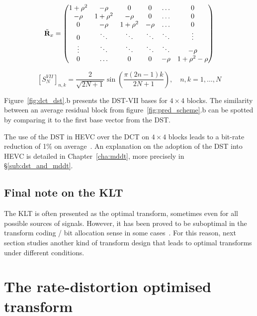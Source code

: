 \documentclass[11pt,a4paper,openright,twoside]{book}
\numberwithin{equation}{section} %
\numberwithin{figure}{section} %
\numberwithin{table}{section} %
\begin{document}
\begin{equation}
	\tilde{\mathbf{R}}_x =
	\begin{pmatrix}
		1+\rho^2 & -\rho    & 0        & 0      & \hdots & 0            \\
		-\rho    & 1+\rho^2 & -\rho    & 0      & \hdots & 0            \\
		0        & -\rho    & 1+\rho^2 & -\rho  & \hdots & 0            \\
		0        & \ddots   & \ddots   & \ddots & \ddots & \vdots       \\
		\vdots   & \ddots   & \ddots   & \ddots & \ddots & -\rho        \\
		0        & \hdots   & 0        & 0      & -\rho  & 1+\rho^2-\rho
	\end{pmatrix}
	\label{eqn:tridiagonal_matrix}
\end{equation}

\begin{equation}
	{\left[S_{N}^{VII} \right]}_{n,k} =
	\frac{2}{\sqrt{2N+1}}\sin\left(\frac{\pi(2n-1)k}{2N+1}\right),
	\quad
	n,k = 1, \dots, N
	\label{eqn:dst_vii}
\end{equation}

Figure~\ref{fig:dct_dst}.b presents the \ac{DST}-VII bases for
$4\times4$ blocks.
The similarity between an average residual block from
figure~\ref{fig:pred_scheme}.b can be spotted by comparing it to the first
base vector from the \ac{DST}.

The use of the \ac{DST} in \ac{HEVC} over the \ac{DCT} on $4\times4$
blocks leads to a bit-rate reduction of 1\% on
average~\cite{sullivan-12-overview-hevc}.
An explanation on the adoption of the \ac{DST} into \ac{HEVC} is detailed in
Chapter~\ref{cha:mddt}, more precisely in \S\ref{sub:dst_and_mddt}.

\subsection{Final note on the \acs{KLT}}
\label{sub:final_note_on_the_klt}

The \ac{KLT} is often presented as the optimal transform, sometimes even for
all possible sources of signals.
However, it has been proved to be suboptimal in the transform coding / bit
allocation sense in some cases~\cite{effros-04-suboptimal-klt}.
For this reason, next section studies another kind of transform design that
leads to optimal transforms under different conditions.

\section{The rate-distortion optimised transform}
\label{sec:rdot}
\end{document}
